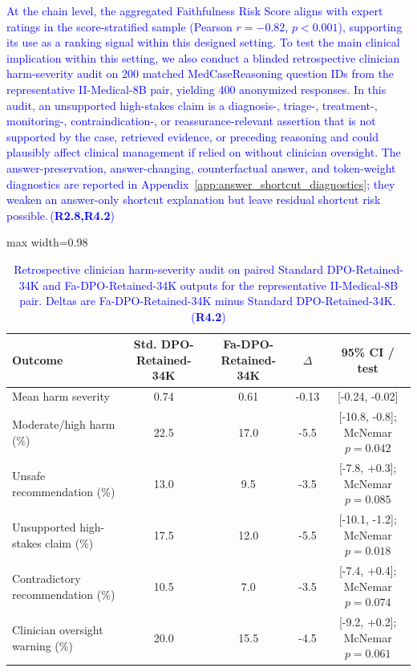 \documentclass[a4paper,fleqn,doubleblind]{cas-sc}
\DeclareRobustCommand{\added}[1]{\textcolor{blue}{#1}}
\DeclareRobustCommand{\revtag}[1]{\textcolor{blue}{\scriptsize\,(\textbf{#1})}}
\begin{document}
\added{At the chain level, the aggregated Faithfulness Risk Score aligns with expert ratings in the score-stratified sample (Pearson $r=-0.82$, $p<0.001$), supporting its use as a ranking signal within this designed setting. To test the main clinical implication within this setting, we also conduct a blinded retrospective clinician harm-severity audit on 200 matched MedCaseReasoning question IDs from the representative II-Medical-8B pair, yielding 400 anonymized responses. In this audit, an unsupported high-stakes claim is a diagnosis-, triage-, treatment-, monitoring-, contraindication-, or reassurance-relevant assertion that is not supported by the case, retrieved evidence, or preceding reasoning and could plausibly affect clinical management if relied on without clinician oversight. The answer-preservation, answer-changing, counterfactual answer, and token-weight diagnostics are reported in Appendix~\ref{app:answer_shortcut_diagnostics}; they weaken an answer-only shortcut explanation but leave residual shortcut risk possible.}\revtag{R2.8,R4.2}

\begin{table}[htbp]
    \centering
    \footnotesize
    \caption{\added{Retrospective clinician harm-severity audit on paired Standard DPO-Retained-34K and Fa-DPO-Retained-34K outputs for the representative II-Medical-8B pair. Deltas are Fa-DPO-Retained-34K minus Standard DPO-Retained-34K.}\revtag{R4.2}}
    \label{tab:harm_severity_audit}
    \begin{adjustbox}{max width=0.98\textwidth}
    \begin{tabular}{lcccc}
        \toprule
        \textbf{Outcome} & \textbf{Std. DPO-Retained-34K} & \textbf{Fa-DPO-Retained-34K} & \textbf{$\Delta$} & \textbf{95\% CI / test} \\
        \midrule
        Mean harm severity & 0.74 & 0.61 & -0.13 & [-0.24, -0.02] \\
        Moderate/high harm (\%) & 22.5 & 17.0 & -5.5 & [-10.8, -0.8]; McNemar $p=0.042$ \\
        Unsafe recommendation (\%) & 13.0 & 9.5 & -3.5 & [-7.8, +0.3]; McNemar $p=0.085$ \\
        Unsupported high-stakes claim (\%) & 17.5 & 12.0 & -5.5 & [-10.1, -1.2]; McNemar $p=0.018$ \\
        Contradictory recommendation (\%) & 10.5 & 7.0 & -3.5 & [-7.4, +0.4]; McNemar $p=0.074$ \\
        Clinician oversight warning (\%) & 20.0 & 15.5 & -4.5 & [-9.2, +0.2]; McNemar $p=0.061$ \\
        \bottomrule
    \end{tabular}
    \end{adjustbox}
\end{table}
\end{document}
